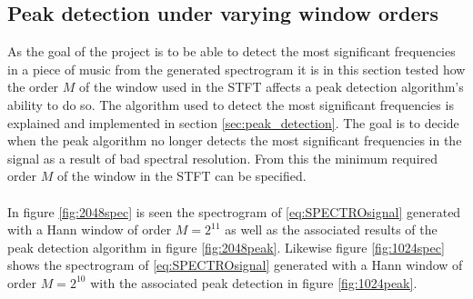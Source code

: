 \subsection{Peak detection under varying window orders}
As the goal of the project is to be able to detect the most significant frequencies in a piece of music from the generated spectrogram it is in this section tested how the order $M$ of the window used in the STFT affects a peak detection algorithm's ability to do so. The algorithm used to detect the most significant frequencies is explained and implemented in section \ref{sec:peak_detection}. The goal is to decide when the peak algorithm no longer detects the most significant frequencies in the signal as a result of bad spectral resolution. From this the minimum required order $M$ of the window in the STFT can be specified.\\\\
In figure \ref{fig:2048spec} is seen the spectrogram of \ref{eq:SPECTROsignal} generated with a Hann window of order $M=2^{11}$ as well as the associated results of the peak detection algorithm in figure \ref{fig:2048peak}. Likewise figure \ref{fig:1024spec}  shows the spectrogram of \eqref{eq:SPECTROsignal} generated with a Hann window of order $M=2^{10}$ with the associated peak detection in figure \ref{fig:1024peak}.
